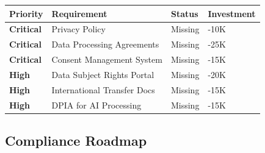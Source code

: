 \documentclass[11pt,a4paper]{article}
\begin{document}
\begin{center}
\begin{tabular}{C{1.5cm} L{5cm} C{2cm} R{2.5cm}}
    \toprule
    \textbf{Priority} & \textbf{Requirement} & \textbf{Status} & \textbf{Investment}\\
    \midrule
    \textbf{Critical} & Privacy Policy & \textcolor{milored}{ Missing} & -10K\\
    \textbf{Critical} & Data Processing Agreements & \textcolor{milored}{ Missing} & -25K\\
    \textbf{Critical} & Consent Management System & \textcolor{milored}{ Missing} & -15K\\
    \textbf{High} & Data Subject Rights Portal & \textcolor{milored}{ Missing} & -20K\\
    \textbf{High} & International Transfer Docs & \textcolor{milored}{ Missing} & -15K\\
    \textbf{High} & DPIA for AI Processing & \textcolor{milored}{ Missing} & -15K\\
    \bottomrule
\end{tabular}
\end{center}

\subsection{Compliance Roadmap}
\end{document}
